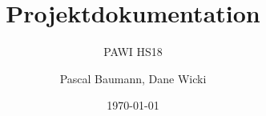 \documentclass[a4paper]{scrreprt}
\title{Projektdokumentation}
\subtitle{PAWI HS18}
\author{Pascal Baumann, Dane Wicki}
\date{\today}
\begin{document}
\begin{titlepage}
\maketitle
\end{titlepage}
\end{document}
